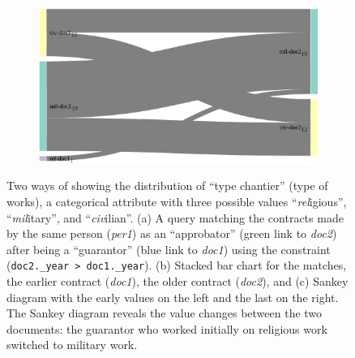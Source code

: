 \begin{figure}
\begin{subfigure}[b]{0.3\linewidth}
    \caption{}
    \end{subfigure}
    \begin{subfigure}[b]{0.44\linewidth}
    \includegraphics[width=\textwidth]{static/figures/ComBiNet/OriginalPaperFigures/CGF/sankeyPLot/sankey_bigger.pdf}
    \caption{}
    \end{subfigure}
    \caption{Two ways of showing the distribution of ``type chantier'' (type of works), a categorical attribute with three possible values ``\textsl{rel}igious'', ``\textsl{mil}itary'', and ``\textsl{civ}ilian''.
    (a) A query matching the contracts made by the same person (\textit{per1}) as an ``approbator'' (green link to \textit{doc2}) after being a ``guarantor'' (blue link to \textit{doc1}) using the constraint (\texttt{doc2.\_year > doc1.\_year}). (b) Stacked bar chart for the matches, the earlier contract (\textit{doc1}), the older contract (\textit{doc2}), and (c) Sankey diagram with the early values on the left and the last on the right.
    The Sankey diagram reveals the value changes between the two documents: the guarantor who worked initially on religious work switched to military work.} \label{fig:sankeys}
\end{figure}

